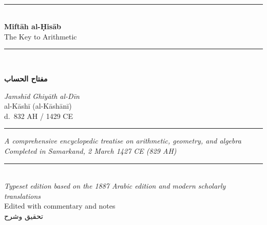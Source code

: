 \documentclass[11pt,a4paper]{article}
\newenvironment{arabicbox}{%
  \begin{framed}
  \begin{minipage}{\dimexpr\linewidth-2\fboxsep-2\fboxrule\relax}
  \setlength{\parindent}{0pt}
  \linespread{1.3}\selectfont
}{%
  \end{minipage}
  \end{framed}
}
\newcommand{\longline}{\noindent\rule{\textwidth}{0.4pt}}
\newcommand{\shortline}{\noindent\rule{0.5\textwidth}{0.4pt}\par}
\newcommand{\ar}[1]{{\arabicfont\beginR #1\endR}}
\begin{document}
\thispagestyle{empty}
\begin{center}
\vspace*{1.5cm}

{\fontsize{14}{16}\selectfont\ar{بسم الله الرحمن الرحيم}}\\[0.8cm]

{\color{rulecolor}\longline}\\[0.6cm]

{\fontsize{28}{34}\selectfont\bfseries\color{titlecolor}
Mift\=ah al-\d{H}is\=ab}\\[0.5cm]
{\fontsize{18}{22}\selectfont\color{sectioncolor}
The Key to Arithmetic}\\[0.3cm]
{\color{rulecolor}\longline}\\[1cm]

\begin{arabicbox}
\begin{center}
\begin{Arabic}
{\Large\textbf{مفتاح الحساب}}
\end{Arabic}
\end{center}
\end{arabicbox}

\vspace{0.8cm}

{\Large\textit{Jamsh\=id Ghiy\=ath al-D\=in}}\\[0.3cm]
{\large al-K\=ash\=i (al-K\=ash\=an\=i)}\\[0.2cm]
{\normalsize d.\ 832 AH / 1429 CE}\\[1cm]

{\color{rulecolor}\shortline}

\vspace{0.5cm}

{\small\textit{A comprehensive encyclopedic treatise on arithmetic, geometry, and algebra}}\\[0.2cm]
{\small\textit{Completed in Samarkand, 2 March 1427 CE (829 AH)}}\\[0.5cm]

{\color{rulecolor}\longline}\\[1cm]

{\small\textit{Typeset edition based on the 1887 Arabic edition and modern scholarly translations}}\\[0.3cm]
{\small Edited with commentary and notes}\\[1cm]

{\footnotesize\ar{تحقيق وشرح}}\\[0.2cm]
\end{center}
\clearpage
\end{document}
